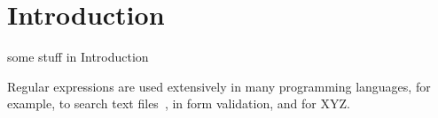 \section{Introduction}

some stuff in Introduction

Regular expressions are used extensively in many programming languages, for example, to search text files~\cite{Clarke:1997:URE:256167.256174}, in form validation, and for XYZ. 
